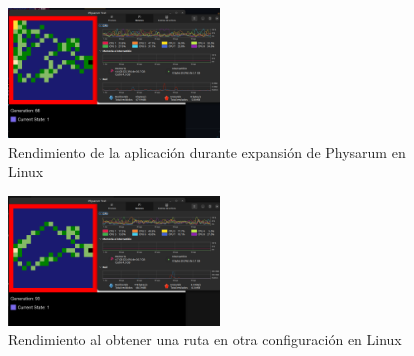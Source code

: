     \vskip 0.5cm
    \begin{figure}[htbp]
        \centering
        \includegraphics[width=0.5\textwidth]{./images/Pruebas/simulador/image037.png}
        \caption{Rendimiento de la aplicaci\'on durante expansi\'on de Physarum en Linux}
        \label{fig:Ruta 15}
    \end{figure}
    \vskip 0.5cm
    \begin{figure}[htbp]
        \centering
        \includegraphics[width=0.5\textwidth]{./images/Pruebas/simulador/image039.png}
        \caption{Rendimiento al obtener una ruta en otra configuraci\'on en Linux}
        \label{fig:Ruta 16}
    \end{figure}
    \vskip 0.5cm
    \clearpage